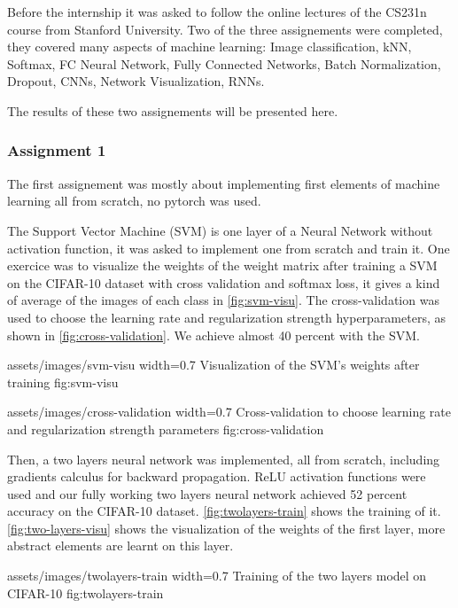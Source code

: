 Before the internship it was asked to follow the online lectures of the CS231n
course from Stanford University. Two of the three assignements were completed,
they covered many aspects of machine learning: Image classification, kNN,
Softmax, FC Neural Network, Fully Connected Networks, Batch Normalization,
Dropout, CNNs, Network Visualization, RNNs. 

The results of these two assignements will be presented here.

\subsubsection{Assignment 1}

The first assignement was mostly about implementing first elements of machine
learning all from scratch, no pytorch was used.

The Support Vector Machine (SVM) is one layer of a Neural Network without
activation function, it was asked to implement one from scratch and train it.
One exercice was to visualize the weights of the weight matrix after training a
SVM on the CIFAR-10 dataset with cross validation and softmax loss, it gives a
kind of average of the images of each class in \cref{fig:svm-visu}. The
cross-validation was used to choose the learning rate and regularization
strength hyperparameters, as shown in \cref{fig:cross-validation}.
We achieve almost 40 percent with the SVM.

\insertfigure
    {assets/images/svm-visu}
    {width=0.7\textwidth}
    {Visualization of the SVM's weights after training}
    {fig:svm-visu}

\insertfigure
    {assets/images/cross-validation}
    {width=0.7\textwidth}
    {Cross-validation to choose learning rate and regularization strength
    parameters}
    {fig:cross-validation}

Then, a two layers neural network was implemented, all from scratch, including
gradients calculus for backward propagation. ReLU activation functions were used
and our fully working two layers neural network achieved 52 percent accuracy on
the CIFAR-10 dataset. \cref{fig:twolayers-train} shows the training of it.
\cref{fig:two-layers-visu} shows the visualization of the weights of the first
layer, more abstract elements are learnt on this layer.

\insertfigure
    {assets/images/twolayers-train}
    {width=0.7\textwidth}
    {Training of the two layers model on CIFAR-10}
    {fig:twolayers-train}


